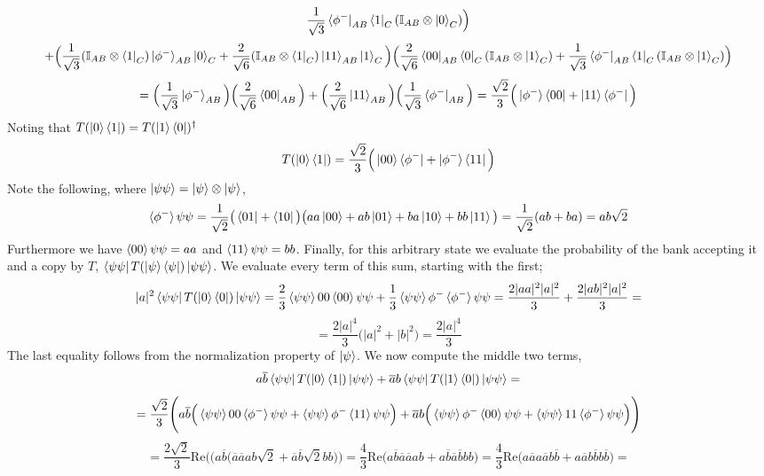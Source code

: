 \documentclass[12pt]{article}
\begin{document}
\begin{enumerate}
$$\frac{1}{\sqrt{3}}\bra{\phi^-}_{AB} \bra{1}_C (\mathbb{I}_{AB}\otimes\ket{0}_C) \Big)$$
$$ + \Big(\frac{1}{\sqrt{3}}(\mathbb{I}_{AB}\otimes\bra{1}_C) \ket{\phi^-}_{AB} \ket{0}_C + \frac{2}{\sqrt{6}} (\mathbb{I}_{AB}\otimes\bra{1}_C) \ket{11}_{AB}\ket{1}_C
\Big)\Big( \frac{2}{\sqrt{6}} \bra{00}_{AB}\bra{0}_C (\mathbb{I}_{AB}\otimes\ket{1}_C) +
\frac{1}{\sqrt{3}}\bra{\phi^-}_{AB} \bra{1}_C (\mathbb{I}_{AB}\otimes\ket{1}_C) \Big)  $$
$$ = \Big(
\frac{1}{\sqrt{3}}\ket{\phi^-}_{AB}
\Big) \Big( \frac{2}{\sqrt{6}} \bra{00}_{AB} \Big) + \Big(\frac{2}{\sqrt{6}} \ket{11}_{AB}\Big)\Big( \frac{1}{\sqrt{3}}\bra{\phi^-}_{AB} \Big) = 
\frac{\sqrt{2}}{3} \Big(\ket{\phi^-}
\bra{00} + \ket{11} \bra{\phi^-} \Big) $$
Noting that $T(\ket{0} \bra{1}) = T(\ket{1} \bra{0})^\dagger$
$$T(\ket{0} \bra{1}) = 
\frac{\sqrt{2}}{3} 
\Big(
\ket{00}\bra{\phi^-} + \ket{\phi^-} \bra{11} \Big)
$$
Note the following, where $\ket{\psi\psi} = \ket{\psi} \otimes \ket{\psi}$,
$$\braket{\phi^-}{\psi\psi} = \frac{1}{\sqrt{2}}\big(\bra{01} + \bra{10}\big) \big(aa \ket{00} + ab \ket{01} + ba \ket{10} + bb \ket{11} \big) = \frac{1}{\sqrt{2}} (ab + ba) = ab\sqrt{2}$$
Furthermore we have $\braket{00}{\psi\psi} = aa$ and $\braket{11}{\psi\psi} = bb$.
Finally, for this arbitrary state we evaluate the probability of the bank accepting it and a copy by $T$, $\bra{\psi \psi} T(\ket{\psi} \bra{\psi}) \ket{\psi \psi}$. We evaluate every term of this sum, starting with the first;
$$ 
|a|^2 \bra{\psi \psi} T(\ket{0} \bra{0}) \ket{\psi \psi} = 
\frac{2}{3} \braket{\psi \psi}{00}\braket{00}{\psi \psi} + \frac{1}{3}\braket{\psi \psi}{\phi^-}\braket{\phi^-}{\psi \psi}
= \frac{2|aa|^2|a|^2}{3} + \frac{2|ab|^2|a|^2}{3} =$$
$$ = \frac{2|a|^4}{3}\Big(|a|^2 + |b|^2 \Big) = \frac{2|a|^4}{3} $$
The last equality follows from the normalization property of $\ket{\psi}$. We now compute the middle two terms,
$$
a\overline{b} \bra{\psi \psi} T(\ket{0} \bra{1}) \ket{\psi \psi} + 
\overline{a}b \bra{\psi \psi} T(\ket{1} \bra{0}) \ket{\psi \psi} = $$
$$ = \frac{\sqrt{2}}{3} \Bigg(
a\overline{b} \Big(
\braket{\psi \psi}{00}\braket{\phi^-}{\psi \psi} + \braket{\psi \psi}{\phi^-} \braket{11}{\psi \psi} \Big)
 + \overline{a}b \Big(
\braket{\psi \psi}{\phi^-}
\braket{00}{\psi \psi} + \braket{\psi \psi}{11} \braket{\phi^-}{\psi \psi} \Big) \Bigg)
$$
$$ = \frac{2\sqrt{2}}{3} \text{Re} \Bigg(
\Big(a\overline{b} \Big(
\overline{a}\overline{a} ab\sqrt{2} + \overline{a}\overline{b}\sqrt{2} bb \Big) \Bigg) = \frac{4}{3}\text{Re}\Big( a\overline{b}\overline{a}\overline{a} ab + a\overline{b}\overline{a}\overline{b} bb \Big) = \frac{4}{3}\text{Re}\Big( a\overline{a}a\overline{a} b\overline{b} + a\overline{a}b\overline{b} b\overline{b} \Big) = 
$$
\end{enumerate}
\end{document}

